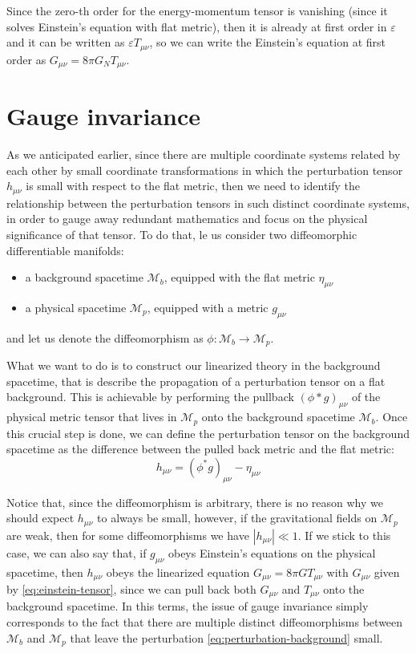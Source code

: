 \documentclass[a4paper]{article}
\begin{document}
Since the zero-th order for the energy-momentum tensor is vanishing (since it solves Einstein's equation with flat metric), then it is already at first order in $\varepsilon$ and it can be written as $\varepsilon T_{\mu\nu}$, so we can write the Einstein's equation at first order as $G_{\mu\nu} = 8\pi G_N T_{\mu\nu}$.

\section{Gauge invariance}
As we anticipated earlier, since there are multiple coordinate systems related by each other by small coordinate transformations in which the perturbation tensor $h_{\mu\nu}$ is small with respect to the flat metric, then we need to identify the relationship between the perturbation tensors in such distinct coordinate systems, in order to gauge away redundant mathematics and focus on the physical significance of that tensor.
To do that, le us consider two diffeomorphic differentiable manifolds:
\begin{itemize}
  \item a background spacetime $\mathcal{M}_b$, equipped with the flat metric $\eta_{\mu\nu}$
  \item a physical spacetime $\mathcal{M}_p$, equipped with a metric $g_{\mu\nu}$
\end{itemize}
and let us denote the diffeomorphism as $\phi: \mathcal{M}_b \rightarrow \mathcal{M}_p$.

What we want to do is to construct our linearized theory in the background spacetime, that is describe the propagation of a perturbation tensor on a flat background.
This is achievable by performing the pullback $(\phi*g)_{\mu\nu}$ of the physical metric tensor that lives in $\mathcal{M}_p$ onto the background spacetime $\mathcal{M}_b$. Once this crucial step is done, we can define the perturbation tensor on the background spacetime as the difference between the pulled back metric and the flat metric:
\begin{equation}
  h_{\mu\nu} = (\phi^*g)_{\mu\nu}-\eta_{\mu\nu}
  \label{eq:perturbation-background}
\end{equation}

Notice that, since the diffeomorphism is arbitrary, there is no reason why we should expect $h_{\mu\nu}$ to always be small, however, if the gravitational fields on $\mathcal{M}_p$ are weak, then for some diffeomorphisms we have $|h_{\mu\nu}| \ll 1$. If we stick to this case, we can also say that, if $g_{\mu\nu}$ obeys Einstein's equations on the physical spacetime, then $h_{\mu\nu}$ obeys the linearized equation $G_{\mu\nu} = 8\pi G T_{\mu\nu}$ with $G_{\mu\nu}$ given by \eqref{eq:einstein-tensor}, since we can pull back both $G_{\mu\nu}$ and $T_{\mu\nu}$ onto the background spacetime.
In this terms, the issue of gauge invariance simply corresponds to the fact that there are multiple distinct diffeomorphisms between $\mathcal{M}_b$ and $\mathcal{M}_p$ that leave the perturbation \eqref{eq:perturbation-background} small.
\end{document}
